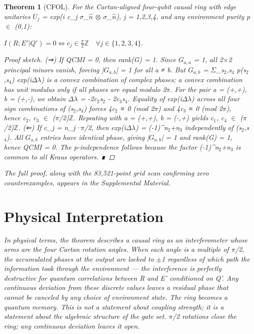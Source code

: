 \documentclass[twocolumn,aps,prl]{revtex4-2}
\newtheorem{theorem}{Theorem}
\begin{document}
\begin{theorem}[CFOL]
For the Cartan-aligned four-qubit causal ring with edge unitaries $U_j$ = exp(i c_j $\sigma$_$\hat{n}$ $\otimes$ $\sigma$_$\hat{n}$), j = 1,2,3,4, and any environment purity p $\in$ (0,1):

$I(R;E'|Q') = 0 \iff c_j \in \frac{\pi}{2}\mathbb{Z} \quad \forall j \in \{1,2,3,4\}.$

\begin{proof}[Proof sketch]
(⇒) If QCMI = 0, then rank(G) = 1. Since $G_{a,a}$ = 1, all 2$\times$2 principal minors vanish, forcing |$G_{a,b}$| = 1 for all a ≠ b. But $G_{a,b}$ = $\Sigma$_{s$_2$,s$_4$} p(s$_2$,s$_4$) exp(i$\Delta\lambda$) is a convex combination of complex phases; a convex combination has unit modulus only if all phases are equal modulo 2$\pi$. For the pair a = (+,+), b = (+,-), we obtain $\Delta\lambda$ = -2c$_2$s$_2$ - 2c$_3$s$_4$. Equality of exp(i$\Delta\lambda$) across all four sign combinations of (s$_2$,s$_4$) forces 4c$_2$ ≡ 0 (mod 2$\pi$) and 4c$_3$ ≡ 0 (mod 2$\pi$), hence c$_2$, c$_3$ $\in$ ($\pi$/2)$\mathbb{Z}$. Repeating with a = (+,+), b = (-,+) yields c$_1$, c$_4$ $\in$ ($\pi$/2)$\mathbb{Z}$. (⇐) If c_j = n_j·$\pi$/2, then exp(i$\Delta\lambda$) = (-1)^{n$_2$+n$_3$} independently of (s$_2$,s$_4$). All $G_{a,b}$ entries have identical phase, giving |$G_{a,b}$| = 1 and rank(G) = 1, hence QCMI = 0. The p-independence follows because the factor (-1)^{n$_2$+n$_3$} is common to all Kraus operators. ∎
\end{proof}

The full proof, along with the 83,521-point grid scan confirming zero counterexamples, appears in the Supplemental Material.

\section{Physical Interpretation}

In physical terms, the theorem describes a causal ring as an interferometer whose arms are the four Cartan rotation angles. When each angle is a multiple of $\pi$/2, the accumulated phases at the output are locked to $\pm$1 regardless of which path the information took through the environment — the interference is perfectly destructive for quantum correlations between R and E' conditioned on Q'. Any continuous deviation from these discrete values leaves a residual phase that cannot be canceled by any choice of environment state. The ring becomes a quantum memory. This is not a statement about coupling strength; it is a statement about the algebraic structure of the gate set. $\pi$/2 rotations close the ring; any continuous deviation leaves it open.


\end{theorem}
\end{document}
